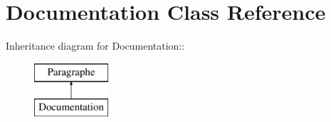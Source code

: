 \hypertarget{class_documentation}{
\section{Documentation Class Reference}
\label{class_documentation}
}
Inheritance diagram for Documentation::\begin{figure}[H]
\begin{center}
\leavevmode
\includegraphics[height=2cm]{class_documentation}
\end{center}
\end{figure}

